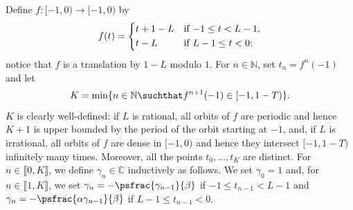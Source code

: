 Define $f: [-1, 0) \to [-1, 0)$ by
\[
f(t) = \begin{dcases*}
t + 1 - L& if $-1 \leq t < L - 1$,\\
t - L& if $L - 1 \leq t < 0$; 
\end{dcases*}
\]
notice that $f$ is a translation by $1 - L$ modulo $1$. For $n \in \mathbb N$, set $t_n = f^n(-1)$ and let
\[
K = \min\{n \in \mathbb N \suchthat f^{n+1}(-1) \in [-1, 1 - T)\}.
\]
$K$ is clearly well-defined: if $L$ is rational, all orbits of $f$ are periodic and hence $K+1$ is upper bounded by the period of the orbit starting at $-1$, and, if $L$ is irrational, all orbits of $f$ are dense in $[-1, 0)$ and hence they intersect $[-1, 1-T)$ infinitely many times. Moreover, all the points $t_0, \dots, t_K$ are distinct. For $n \in \llbracket 0, K\rrbracket$, we define $\gamma_n \in \mathbb C$ inductively as follows. We set $\gamma_0 = 1$ and, for $n \in \llbracket 1, K\rrbracket$, we set $\gamma_n = -\psfrac{\gamma_{n-1}}{\beta}$ if $-1 \leq t_{n-1} < L - 1$ and $\gamma_n = -\psfrac{\alpha \gamma_{n-1}}{\beta}$ if $L - 1 \leq t_{n-1} < 0$.

